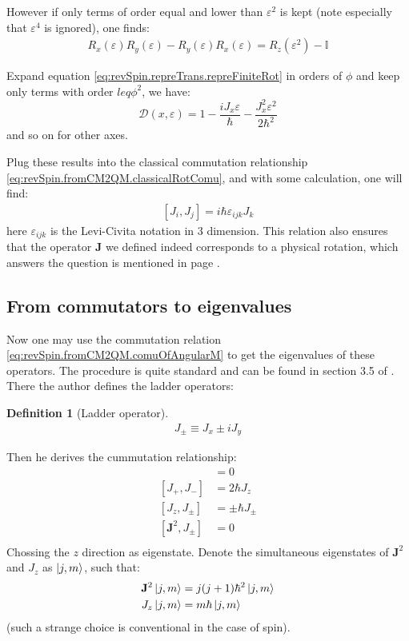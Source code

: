 \documentclass{article}
\numberwithin{equation}{subsection} %
\newtheorem{defi}{Definition}[section]
\theoremstyle{definition}
\begin{document}
However if only terms of order equal and lower than $\varepsilon^2$ is kept
(note especially that $\varepsilon^4$ is ignored), one finds:
\begin{align}
    \label{eq:revSpin.fromCM2QM.classicalRotComu}
    R_x(\varepsilon)R_y(\varepsilon)-R_y(\varepsilon)R_x(\varepsilon)=
    R_z(\varepsilon^2)-\mathbb{I}
\end{align}

Expand equation \ref{eq:revSpin.repreTrans.repreFiniteRot} in orders of
$\phi$ and keep only terms with order $leq \phi^2$, we have:
$$
\mathscr{D}(x,\varepsilon)=
1-\frac{iJ_x \varepsilon}{\hbar}-\frac{J_x^2 \varepsilon^2}{2\hbar^2}
$$
and so on for other axes.

Plug these results into the classical commutation relationship
\ref{eq:revSpin.fromCM2QM.classicalRotComu}, and with some calculation,
one will find:
\begin{align}
    \label{eq:revSpin.fromCM2QM.comuOfAngularM}
    [J_i,J_j]=i\hbar \varepsilon_{ijk}J_k
\end{align}
here $\varepsilon_{ijk}$ is the Levi-Civita notation in $3$ dimension.
This relation also ensures that the operator $\mathbf{J}$ we defined
indeed corresponds to a physical rotation, which answers the question is
mentioned in page \pageref{page:question-def_of_J}.

\subsection{From commutators to eigenvalues}
\label{sec:From-commutators-to-eigenvalues}
Now one may use the commutation relation
\ref{eq:revSpin.fromCM2QM.comuOfAngularM} to get the eigenvalues of these
operators. The procedure is quite standard and can be found in section 3.5
of \cite{sakurai}. There the author defines the ladder operators:
\begin{defi}[Ladder operator]
    \begin{align}
        J_{\pm}\equiv J_x \pm i J_y
    \end{align}
\end{defi}
Then he derives the cummutation relationship:
\begin{align}
    [\mathbf{J}^2,J_k] &= 0\\
    [J_+,J_-] &=2\hbar J_z \\
    [J_z,J_\pm] &= \pm \hbar J_\pm \\
    [\mathbf{J}^2,J_\pm] &=0 \\
\end{align}
Chossing the $z$ direction as eigenstate. Denote the simultaneous
eigenstates of $\mathbf{J}^2$ and $J_z$ as $\ket{j,m}$, such that:
\begin{align}
    \mathbf{J}^2\ket{j,m} &= j(j+1)\hbar^2 \ket{j,m} \\
    J_z \ket{j,m} &= m \hbar\ket{j,m}
\end{align}
(such a strange choice is conventional in the case of spin).
\end{document}
